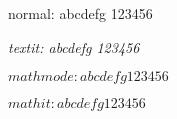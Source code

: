 \documentclass{article}
\begin{document}
\huge

normal: abcdefg 123456

\textit{textit: abcdefg 123456}

$mathmode: abcdefg 123456$

$mathit: \mathit{abcdefg 123456}$
\end{document}
